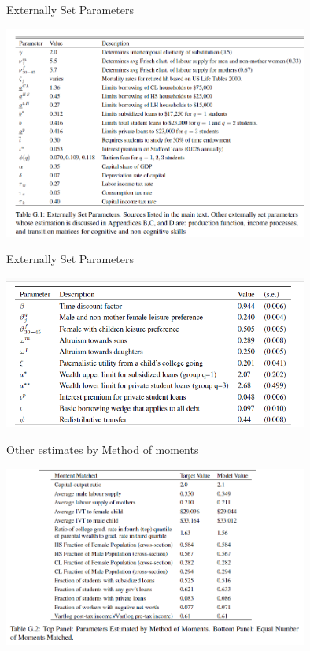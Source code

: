 \documentclass{beamer}
\begin{document}
\begin{frame}[label=supplemental]{Externally Set Parameters}
\hyperlink{Return1}{}
\begin{center}
\includegraphics[width=100mm]{Image1.png}
\end{center}
\end{frame}

\begin{frame}[label=supplemental1]{Externally Set Parameters}
\hyperlink{Return1}{}
\begin{center}
\includegraphics[width=100mm]{Image2.png}
\end{center}
\end{frame}

\begin{frame}[label=supplemental2]{Other estimates by Method of moments}
\hyperlink{Return1}{}
\begin{center}
\includegraphics[width=100mm]{Image3.png}
\end{center}
\end{frame}
\end{document}
